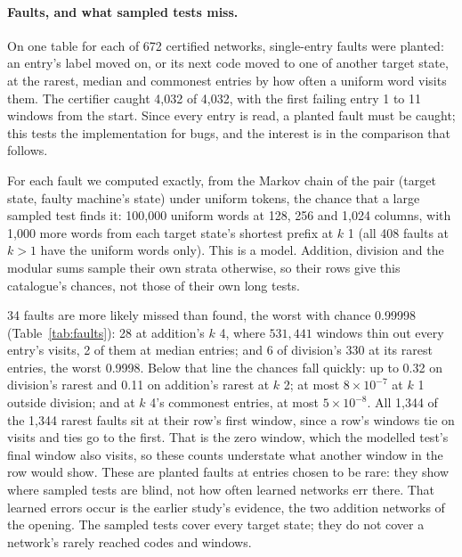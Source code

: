 \documentclass[11pt]{article}
\newcommand{\pn}[2]{#2}
\theoremstyle{definition}
\begin{document}
\paragraph{Faults, and what sampled tests miss.} On one table for each of
\pn{fault-tables}{672} certified networks, single-entry faults were planted: an entry's label moved on,
or its next code moved to one of another target state, at the rarest, median and commonest entries by how
often a uniform word visits them. The certifier caught \pn{faults-caught}{4{,}032} of
\pn{faults}{4{,}032}, with the first failing entry 1 to \pn{fault-longest}{11} windows from the start.
Since every entry is read, a planted fault must be caught; this tests the implementation for bugs, and
the interest is in the comparison that follows.

For each fault we computed exactly, from the Markov chain of the pair (target state, faulty machine's
state) under uniform tokens, the chance that a large sampled test finds it: 100{,}000 uniform words at
128, 256 and 1{,}024 columns, with 1{,}000 more words from each target state's shortest prefix at $k$ 1
(all \pn{faults-wide}{408} faults at $k > 1$ have the uniform words only). This is a model. Addition,
division and the modular sums sample their own strata otherwise, so their rows give this catalogue's
chances, not those of their own long tests.

\pn{faults-likely-missed}{34} faults are more likely missed than found, the worst with chance
\pn{fault-worst-miss}{0.99998} (Table~\ref{tab:faults}): \pn{faults-wide-missed}{28} at addition's
$k$ 4, where $531{,}441$ windows thin out every entry's visits, \pn{faults-wide-median-missed}{2} of them
at median entries; and \pn{faults-division-rarest-missed}{6} of division's
\pn{faults-division-rarest}{330} at its rarest entries, the worst \pn{fault-division-worst}{0.9998}.
Below that line the chances fall quickly: up to \pn{fault-division-below}{0.32} on division's rarest and
\pn{fault-short-worst}{0.11} on addition's rarest at $k$ 2; at most
\pn{fault-elsewhere-worst}{$8 \times 10^{-7}$} at $k$ 1 outside division; and at $k$ 4's commonest entries,
at most \pn{fault-wide-worst-common}{$5 \times 10^{-8}$}. All \pn{faults-rarest-first-window}{1{,}344} of
the \pn{faults-rarest}{1{,}344} rarest faults sit at their row's first window, since a row's windows tie on
visits and ties go to the first. That is the zero window, which the modelled test's final window also
visits, so these counts understate what another window in the row would show. These are planted faults
at entries chosen to be rare: they show where sampled tests are blind, not how often learned networks err
there. That learned errors occur is the earlier study's evidence, the two addition networks of the opening.
The sampled tests cover every target state; they do not cover a network's rarely reached codes and windows.
\end{document}
